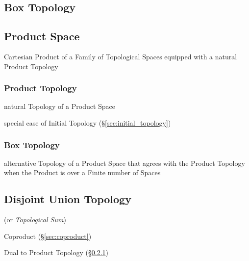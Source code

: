 \subsection{Box Topology}\label{sec:box_topology}

\subsection{Product Space}\label{sec:product_space}

Cartesian Product of a Family of Topological Spaces equipped with a natural
Product Topology



\subsubsection{Product Topology}\label{sec:product_topology}

natural Topology of a Product Space

special case of Initial Topology (\S\ref{sec:initial_topology})



\subsubsection{Box Topology}\label{sec:box_topology}

alternative Topology of a Product Space that agrees with the Product Topology
when the Product is over a Finite number of Spaces



\subsection{Disjoint Union Topology}\label{sec:disjoint_union_topology}

(or \emph{Topological Sum})

Coproduct (\S\ref{sec:coproduct})

Dual to Product Topology (\S\ref{sec:product_topology})



